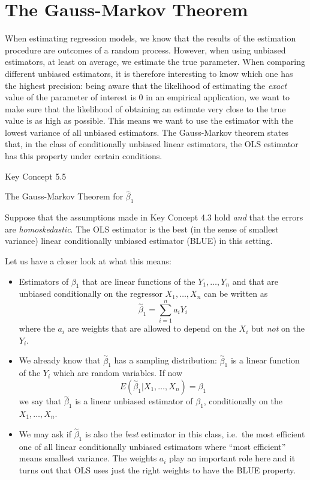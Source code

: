 \documentclass[]{book}
\theoremstyle{definition}
\theoremstyle{definition}
\theoremstyle{definition}
\theoremstyle{remark}
\begin{document}
\section{The Gauss-Markov Theorem}\label{the-gauss-markov-theorem}

When estimating regression models, we know that the results of the
estimation procedure are outcomes of a random process. However, when
using unbiased estimators, at least on average, we estimate the true
parameter. When comparing different unbiased estimators, it is therefore
interesting to know which one has the highest precision: being aware
that the likelihood of estimating the \emph{exact} value of the
parameter of interest is \(0\) in an empirical application, we want to
make sure that the likelihood of obtaining an estimate very close to the
true value is as high as possible. This means we want to use the
estimator with the lowest variance of all unbiased estimators. The
Gauss-Markov theorem states that, in the class of conditionally unbiased
linear estimators, the OLS estimator has this property under certain
conditions.

Key Concept 5.5

The Gauss-Markov Theorem for \(\hat{\beta}_1\)

Suppose that the assumptions made in Key Concept 4.3 hold \emph{and}
that the errors are \emph{homoskedastic}. The OLS estimator is the best
(in the sense of smallest variance) linear conditionally unbiased
estimator (BLUE) in this setting.

Let us have a closer look at what this means:

\begin{itemize}
\item
  Estimators of \(\beta_1\) that are linear functions of the
  \(Y_1, \dots, Y_n\) and that are unbiased conditionally on the
  regressor \(X_1, \dots, X_n\) can be written as
  \[ \overset{\sim}{\beta}_1 = \sum_{i=1}^n a_i Y_i \] where the \(a_i\)
  are weights that are allowed to depend on the \(X_i\) but \emph{not}
  on the \(Y_i\).
\item
  We already know that \(\overset{\sim}{\beta}_1\) has a sampling
  distribution: \(\overset{\sim}{\beta}_1\) is a linear function of the
  \(Y_i\) which are random variables. If now
  \[ E(\overset{\sim}{\beta}_1 | X_1, \dots, X_n) = \beta_1 \] we say
  that \(\overset{\sim}{\beta}_1\) is a linear unbiased estimator of
  \(\beta_1\), conditionally on the \(X_1, \dots, X_n\).
\item
  We may ask if \(\overset{\sim}{\beta}_1\) is also the \emph{best}
  estimator in this class, i.e.~the most efficient one of all linear
  conditionally unbiased estimators where ``most efficient'' means
  smallest variance. The weights \(a_i\) play an important role here and
  it turns out that OLS uses just the right weights to have the BLUE
  property.
\end{itemize}
\end{document}
